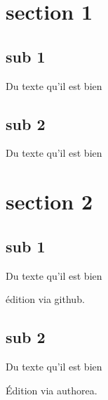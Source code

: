 
\section{section 1}
\subsection{sub 1}

Du texte qu'il est bien \cite{zander2011}

\subsection{sub 2}

Du texte qu'il est bien

\section{section 2}

\subsection{sub 1}

Du texte qu'il est bien

édition via github.

\subsection{sub 2}

Du texte qu'il est bien

Édition via authorea.

